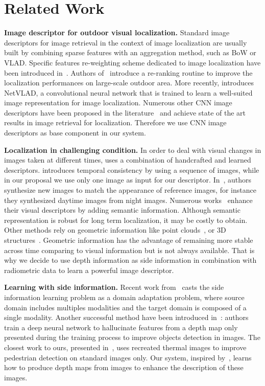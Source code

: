\section{Related Work}
\label{sec:related_work}

\vspace{4pt}\noindent\textbf{Image descriptor for outdoor visual localization.} Standard image descriptors for image retrieval in the context of image localization are usually built by combining sparse features with an aggregation method, such as BoW or VLAD. Specific features re-weighting scheme dedicated to image localization have been introduced in~\cite{Arandjelovic2014}. Authors of~\cite{Sattler2016} introduce a re-ranking routine to improve the localization performances on large-scale outdoor area. More recently, \cite{Arandjelovic2017} introduces NetVLAD, a convolutional neural network that is trained to learn a well-suited image representation for image localization. Numerous other CNN image descriptors have been proposed in the literature~\cite{Kim2017a,Gordo2017,Radenovic2017,Sunderhauf2015a,Liu2018} and achieve state of the art results in image retrieval for localization. Therefore we use CNN image descriptors as base component in our system.

\vspace{4pt}\noindent\textbf{Localization in challenging condition.} In order to deal with visual changes in images taken at different times, \cite{Naseer2018} uses a combination of handcrafted and learned descriptors. \cite{Garg2018} introduces temporal consistency by using a sequence of images, while in our proposal we use only one image as input for our descriptor. In~\cite{Porav2018}, authors synthesize new images to match the appearance of reference images, for instance they synthesized daytime images from night images. Numerous works~\cite{Stenborg2018,Toft2018,Naseer2017a} enhance their visual descriptors by adding semantic information. Although semantic representation is robust for long term localization, it may be costly to obtain. Other methods rely on geometric information like point clouds~\cite{Sattler2018,Schonberger2018}, or 3D structures~\cite{Torii2015}. Geometric information has the advantage of remaining more stable across time comparing to visual information but is not always available. That is why we decide to use depth information as side information in combination with radiometric data to learn a powerful image descriptor.

\vspace{4pt}\noindent\textbf{Learning with side information.} Recent work from~\cite{Li2017b} casts the side information learning problem as a domain adaptation problem, where source domain includes multiples modalities and the target domain is composed of a single modality. Another successful method have been introduced in~\cite{Hoffman2016}: authors train a deep neural network to hallucinate features from a depth map only presented during the training process to improve objects detection in images. The closest work to ours, presented in~\cite{xu2017learning}, uses recreated thermal images to improve pedestrian detection on standard images only. Our system, inspired by~\cite{xu2017learning}, learns how to produce depth maps from images to enhance the description of these images.
